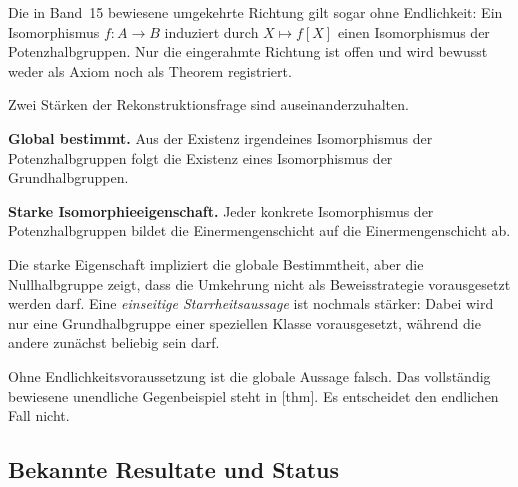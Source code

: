 \documentclass[main.tex]{subfiles}
\begin{document}
\begin{samepage}
\begin{center}
\end{center}
\end{samepage}

Die in Band~15 bewiesene umgekehrte Richtung gilt sogar ohne Endlichkeit:
Ein Isomorphismus \(f\colon A\to B\) induziert durch \(X\mapsto f[X]\) einen
Isomorphismus der Potenzhalbgruppen.  Nur die eingerahmte Richtung ist offen
und wird bewusst weder als Axiom noch als Theorem registriert.

Zwei Stärken der Rekonstruktionsfrage sind auseinanderzuhalten.

\smallskip
\noindent\textbf{Global bestimmt.}
Aus der Existenz irgendeines Isomorphismus der Potenzhalbgruppen folgt die
Existenz eines Isomorphismus der Grundhalbgruppen.

\smallskip
\noindent\textbf{Starke Isomorphieeigenschaft.}
Jeder konkrete Isomorphismus der Potenzhalbgruppen bildet die
Einermengenschicht auf die Einermengenschicht ab.

\smallskip
Die starke Eigenschaft impliziert die globale Bestimmtheit, aber die
Nullhalbgruppe zeigt, dass die Umkehrung nicht als Beweisstrategie vorausgesetzt
werden darf.  Eine \emph{einseitige Starrheitsaussage} ist nochmals stärker:
Dabei wird nur eine Grundhalbgruppe einer speziellen Klasse vorausgesetzt,
während die andere zunächst beliebig sein darf.

Ohne Endlichkeitsvoraussetzung ist die globale Aussage falsch.  Das
vollständig bewiesene unendliche Gegenbeispiel steht in
[thm].  Es entscheidet den
endlichen Fall nicht.

\subsection{Bekannte Resultate und Status}
\end{document}
